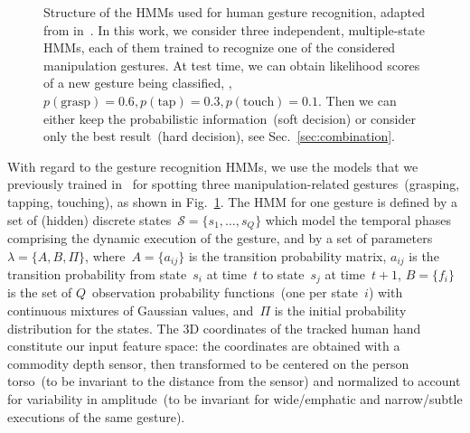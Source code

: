 \newcommand{\modeltwo}{
}

\begin{figure}
  \centering
  \modeltwo
  \caption{Structure of the \acp{HMM} used for human gesture recognition, adapted from in~\cite{saponaro:2013:crhri}. In this work, we consider three independent, multiple-state \acp{HMM}, each of them trained to recognize one of the considered manipulation gestures. At test time, we can obtain likelihood scores of a new gesture being classified, \eg, $p(\text{grasp})=0.6, p(\text{tap})=0.3, p(\text{touch})=0.1$. Then we can either keep the probabilistic information~(soft decision) or consider only the best result~(hard decision), see Sec.~\ref{sec:combination}.}%
  \label{fig:hmms}
\end{figure}

With regard to the gesture recognition \acsp{HMM}, we use the models that we previously trained in~\cite{saponaro:2013:crhri} for spotting three manipulation-related gestures~(grasping, tapping, touching), as shown in Fig.~\ref{fig:hmms}. The \ac{HMM} for one gesture is defined by a set of (hidden) discrete states~$\mathcal{S} = \{s_1, \dots, s_Q\}$ which model the temporal phases comprising the dynamic execution of the gesture, and by a set of parameters~$\lambda = \{ A, B, \Pi \}$, where~$A = \{ a_{ij} \}$ is the transition probability matrix, $a_{ij}$ is the transition probability from state~$s_i$ at time~$t$ to state~$s_j$ at time~$t+1$, $B = \{ f_i \}$ is the set of $Q$~observation probability functions~(one per state~$i$) with continuous mixtures of Gaussian values, and~$\Pi$ is the initial probability distribution for the states. The 3D coordinates of the tracked human hand constitute our input feature space: the coordinates are obtained with a commodity depth sensor, then transformed to be centered on the person torso~(to be invariant to the distance from the sensor) and normalized to account for variability in amplitude~(to be invariant for wide/emphatic and narrow/subtle executions of the same gesture).

